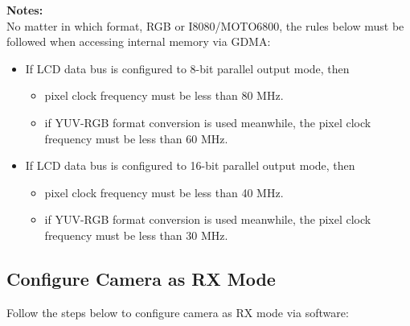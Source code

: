 \documentclass[main\_\_EN.tex]{subfiles}
\begin{document}
\textbf{Notes:}\\
No matter in which format, RGB or I8080/MOTO6800, the rules below must be followed when accessing internal memory via GDMA:
\begin{itemize}
    \item If LCD data bus is configured to 8-bit parallel output mode, then
    \begin{itemize}
        \item pixel clock frequency must be less than 80 MHz.
        \item if YUV-RGB format conversion is used meanwhile, the pixel clock frequency must be less than 60 MHz.
    \end{itemize}
    \item If LCD data bus is configured to 16-bit parallel output mode, then
    \begin{itemize}
        \item pixel clock frequency must be less than 40 MHz.
        \item if YUV-RGB format conversion is used meanwhile, the pixel clock frequency must be less than 30 MHz.
    \end{itemize}
\end{itemize}

\subsection{Configure Camera as RX Mode}
Follow the steps below to configure camera as RX mode via software:
\end{document}
